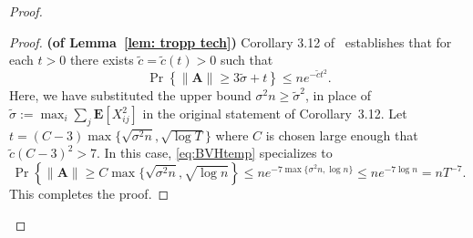 \documentclass[twoside,11pt]{article}
\newcommand{\E}{\mathbf{E}}
\DeclareMathOperator{\pr}{Pr}
\newcommand{\bs}{\boldsymbol}
\newcommand{\0}{\bs{0}}
\newcommand{\bra}[1]{\ensuremath{\left\{ #1 \right\}}} %
\begin{document}
{\begin{proof}
\begin{proof}
\newcommand{\ct}{\tilde c}
	{\bf (of Lemma~\ref{lem: tropp tech})}
	Corollary 3.12 of~\cite{bandeira2016sharp} establishes that for each $t>0$
	there exists $\tilde c = \tilde c(t) > 0$ such that
	\begin{equation} \label{eq:BVHtemp}
		\pr \bra{ \|\bs{A}\| \ge 3 \tilde \sigma + t } \le n e^{-\ct t^2}.
	\end{equation}
	Here, we have substituted the upper bound $\sigma^2 n \ge \tilde \sigma^2$, in place of $\tilde \sigma:= \max_i \sum_{j} \E[X_{ij}^2]$ in the original statement of Corollary~3.12.
	Let $t = (C-3) \max\{ \sqrt{\sigma^2 n}, \sqrt{\log T} \}$ where $C$ is chosen large enough that $\ct 	(C-3)^2 > 7$.
	In this case, \eqref{eq:BVHtemp} specializes to
	\[
		\pr \bra{\|\bs{A}\| \ge C \max\{ \sqrt{\sigma^2 n}, \sqrt{\log n} }
		\le n e^{-7 \max\{\sigma^2 n, \log n\}} \le n e^{-7 \log n} = n T^{-7}.
	\]
	This completes the proof.
\end{proof}


\end{proof}}
\end{document}

